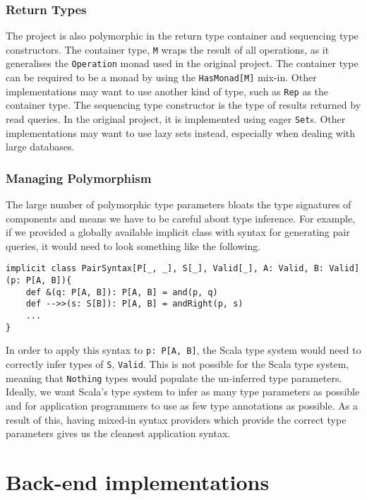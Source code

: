 \documentclass{report}
\newcommand \2[0]{\textbf{2}}
\newcommand \3[0]{\textbf{3}}
\begin{document}
\subsection{Return Types}
The project is also polymorphic in the return type container and sequencing type constructors. The container type, \texttt{M} wraps the result of all operations, as it generalises the \texttt{Operation} monad used in the original project. The container type can be required to be a monad by using the \texttt{HasMonad[M]} mix-in. Other implementations may want to use another kind of type, such as \texttt{Rep} as the container type. The sequencing type constructor is the type of results returned by read queries. In the original project, it is implemented using eager \texttt{Set}s. Other implementations may want to use lazy sets instead, especially when dealing with large databases.

\subsection{Managing Polymorphism}
The large number of polymorphic type parameters bloats the type signatures of components and means we have to be careful about type inference. For example, if we provided a globally available implicit class with syntax for generating pair queries, it would need to look something like the following.

\begin{verbatim}
implicit class PairSyntax[P[_, _], S[_], Valid[_], A: Valid, B: Valid](p: P[A, B]){
    def &(q: P[A, B]): P[A, B] = and(p, q)
    def -->>(s: S[B]): P[A, B] = andRight(p, s)
    ...
}
\end{verbatim}

In order to apply this syntax to \texttt{p: P[A, B]}, the Scala type system would need to correctly infer types of \texttt{S}, \texttt{Valid}. This is not possible for the Scala type system, meaning that \texttt{Nothing} types would populate the un-inferred type parameters. Ideally, we want Scala's type system to infer as many type parameters as possible and for application programmers to use as few type annotations as possible. As a result of this, having mixed-in syntax providers which provide the correct type parameters gives us the cleanest application syntax.

\chapter{Back-end implementations}
\end{document}
